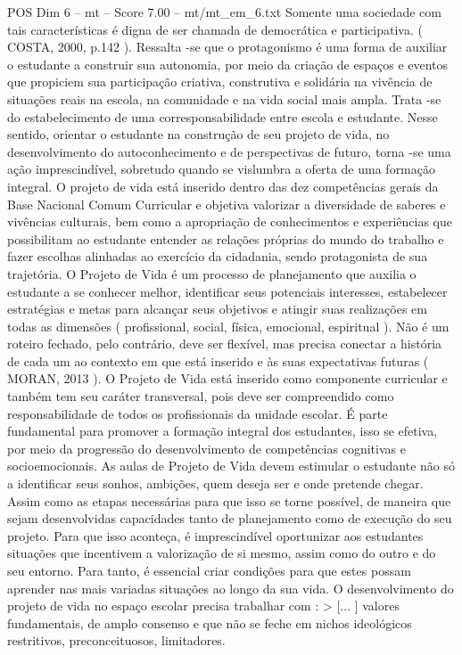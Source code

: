\begin{textsample}{POS Dim 6 – mt – Score 7.00 – mt/mt\_em\_6.txt}
Somente uma sociedade com tais características é digna de ser chamada de democrática e participativa. ( COSTA, 2000, p.142 ).
Ressalta -se que o protagonismo é uma forma de auxiliar o estudante a construir sua autonomia, por meio da criação de espaços e eventos que propiciem sua participação criativa, construtiva e solidária na vivência de situações reais na escola, na comunidade e na vida social mais ampla.
Trata -se do estabelecimento de uma corresponsabilidade entre escola e estudante.
Nesse sentido, orientar o estudante na construção de seu projeto de vida, no desenvolvimento do autoconhecimento e de perspectivas de futuro, torna -se uma ação imprescindível, sobretudo quando se vislumbra a oferta de uma formação integral.
O projeto de vida está inserido dentro das dez competências gerais da Base Nacional Comum Curricular e objetiva valorizar a diversidade de saberes e vivências culturais, bem como a apropriação de conhecimentos e experiências que possibilitam ao estudante entender as relações próprias do mundo do trabalho e fazer escolhas alinhadas ao exercício da cidadania, sendo protagonista de sua trajetória.
O Projeto de Vida é um processo de planejamento que auxilia o estudante a se conhecer melhor, identificar seus potenciais interesses, estabelecer estratégias e metas para alcançar seus objetivos e atingir suas realizações em todas as dimensões ( profissional, social, física, emocional, espiritual ).
Não é um roteiro fechado, pelo contrário, deve ser flexível, mas precisa conectar a história de cada um ao contexto em que está inserido e às suas expectativas futuras ( MORAN, 2013 ).
O Projeto de Vida está inserido como componente curricular e também tem seu caráter transversal, pois deve ser compreendido como responsabilidade de todos os profissionais da unidade escolar.
É parte fundamental para promover a formação integral dos estudantes, isso se efetiva, por meio da progressão do desenvolvimento de competências cognitivas e socioemocionais.
As aulas de Projeto de Vida devem estimular o estudante não só a identificar seus sonhos, ambições, quem deseja ser e onde pretende chegar.
Assim como as etapas necessárias para que isso se torne possível, de maneira que sejam desenvolvidas capacidades tanto de planejamento como de execução do seu projeto.
Para que isso aconteça, é imprescindível oportunizar aos estudantes situações que incentivem a valorização de si mesmo, assim como do outro e do seu entorno.
Para tanto, é essencial criar condições para que estes possam aprender nas mais variadas situações ao longo da sua vida.
O desenvolvimento do projeto de vida no espaço escolar precisa trabalhar com : > [... ] valores fundamentais, de amplo consenso e que não se feche em nichos ideológicos restritivos, preconceituosos, limitadores.

\end{textsample}
